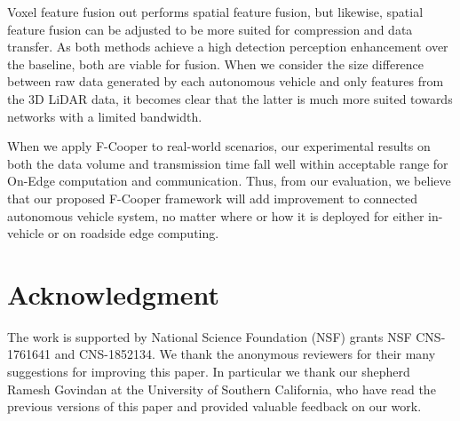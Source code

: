 \documentclass[sigconf]{acmart}
\begin{document}
Voxel feature fusion out performs spatial feature fusion, but likewise, spatial feature fusion can be adjusted to be more suited for compression and data transfer. As both methods achieve a high detection perception enhancement over the baseline, both are viable for fusion. 
When we consider the size difference between raw data generated by each autonomous vehicle and only features from the 3D LiDAR data, it becomes clear that the latter is much more suited towards networks with a limited bandwidth. 

When we apply F-Cooper to real-world scenarios, our experimental results on both the data volume and transmission time fall well within acceptable range for On-Edge computation and communication. Thus, from our evaluation, we believe that our proposed F-Cooper framework will add improvement to connected autonomous vehicle system, no matter where or how it is deployed for either in-vehicle or on roadside edge computing. 


\section*{Acknowledgment}
The work is supported by National Science Foundation (NSF) grants NSF CNS-1761641 and CNS-1852134. We thank the anonymous reviewers for their many suggestions for improving this paper. In particular we thank our shepherd Ramesh Govindan at the University of Southern California, who have read the previous versions of this paper and provided valuable feedback on
our work.











\end{document}
